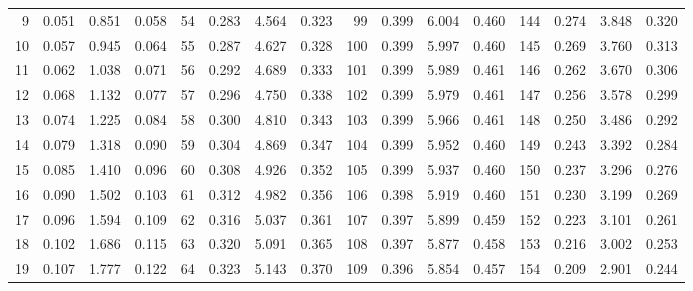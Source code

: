 \begin{table}
{\begin{tabular}{rrrr|rrrr|rrrr|rrrr}
  9 & \tiny{  0.051} &   0.851 & \tiny{  0.058} &  54 & \tiny{  0.283} &   4.564 & \tiny{  0.323} &  99 & \tiny{  0.399} &   6.004 & \tiny{  0.460} & 144 & \tiny{  0.274} &   3.848 & \tiny{  0.320}\\
 10 & \tiny{  0.057} &   0.945 & \tiny{  0.064} &  55 & \tiny{  0.287} &   4.627 & \tiny{  0.328} & 100 & \tiny{  0.399} &   5.997 & \tiny{  0.460} & 145 & \tiny{  0.269} &   3.760 & \tiny{  0.313}\\
 11 & \tiny{  0.062} &   1.038 & \tiny{  0.071} &  56 & \tiny{  0.292} &   4.689 & \tiny{  0.333} & 101 & \tiny{  0.399} &   5.989 & \tiny{  0.461} & 146 & \tiny{  0.262} &   3.670 & \tiny{  0.306}\\
 12 & \tiny{  0.068} &   1.132 & \tiny{  0.077} &  57 & \tiny{  0.296} &   4.750 & \tiny{  0.338} & 102 & \tiny{  0.399} &   5.979 & \tiny{  0.461} & 147 & \tiny{  0.256} &   3.578 & \tiny{  0.299}\\
 13 & \tiny{  0.074} &   1.225 & \tiny{  0.084} &  58 & \tiny{  0.300} &   4.810 & \tiny{  0.343} & 103 & \tiny{  0.399} &   5.966 & \tiny{  0.461} & 148 & \tiny{  0.250} &   3.486 & \tiny{  0.292}\\
 14 & \tiny{  0.079} &   1.318 & \tiny{  0.090} &  59 & \tiny{  0.304} &   4.869 & \tiny{  0.347} & 104 & \tiny{  0.399} &   5.952 & \tiny{  0.460} & 149 & \tiny{  0.243} &   3.392 & \tiny{  0.284}\\
 15 & \tiny{  0.085} &   1.410 & \tiny{  0.096} &  60 & \tiny{  0.308} &   4.926 & \tiny{  0.352} & 105 & \tiny{  0.399} &   5.937 & \tiny{  0.460} & 150 & \tiny{  0.237} &   3.296 & \tiny{  0.276}\\
 16 & \tiny{  0.090} &   1.502 & \tiny{  0.103} &  61 & \tiny{  0.312} &   4.982 & \tiny{  0.356} & 106 & \tiny{  0.398} &   5.919 & \tiny{  0.460} & 151 & \tiny{  0.230} &   3.199 & \tiny{  0.269}\\
 17 & \tiny{  0.096} &   1.594 & \tiny{  0.109} &  62 & \tiny{  0.316} &   5.037 & \tiny{  0.361} & 107 & \tiny{  0.397} &   5.899 & \tiny{  0.459} & 152 & \tiny{  0.223} &   3.101 & \tiny{  0.261}\\
 18 & \tiny{  0.102} &   1.686 & \tiny{  0.115} &  63 & \tiny{  0.320} &   5.091 & \tiny{  0.365} & 108 & \tiny{  0.397} &   5.877 & \tiny{  0.458} & 153 & \tiny{  0.216} &   3.002 & \tiny{  0.253}\\
 19 & \tiny{  0.107} &   1.777 & \tiny{  0.122} &  64 & \tiny{  0.323} &   5.143 & \tiny{  0.370} & 109 & \tiny{  0.396} &   5.854 & \tiny{  0.457} & 154 & \tiny{  0.209} &   2.901 & \tiny{  0.244}\\

\end{tabular}}
\end{table}

